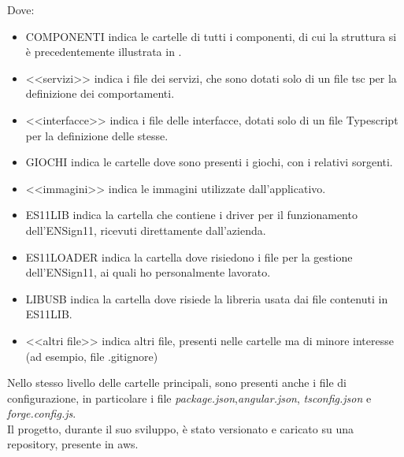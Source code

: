 Dove:
\begin{itemize}
    \item COMPONENTI indica le cartelle di tutti i componenti, di cui la struttura si è precedentemente illustrata in .
    \item <<servizi>> indica i file dei servizi, che sono dotati solo di un file \Gls{tsc} per la definizione dei comportamenti.
    \item <<interfacce>> indica i file delle interfacce, dotati solo di un file Typescript per la definizione delle stesse.
    \item GIOCHI indica le cartelle dove sono presenti i giochi, con i relativi sorgenti.
    \item <<immagini>> indica le immagini utilizzate dall'applicativo.
    \item ES11LIB indica la cartella che contiene i driver per il funzionamento dell'ENSign11, ricevuti direttamente dall'azienda.
    \item ES11LOADER indica la cartella dove risiedono i file per la gestione dell'ENSign11, ai quali ho personalmente lavorato.
    \item LIBUSB indica la cartella dove risiede la libreria usata dai file contenuti in ES11LIB.
    \item <<altri file>> indica altri file, presenti nelle cartelle ma di minore interesse (ad esempio, file .gitignore)
\end{itemize}
Nello stesso livello delle cartelle principali, sono presenti anche i file di configurazione, in particolare i file \emph{package.json},\emph{angular.json}, \emph{tsconfig.json} e \emph{forge.config.js}.\\
Il progetto, durante il suo sviluppo, è stato versionato e caricato su una repository, presente in \gls{aws}.